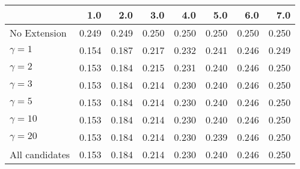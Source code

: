 \begin{tabular}{lrrrrrrr}
\toprule
{} &   1.0 &   2.0 &   3.0 &   4.0 &   5.0 &   6.0 &   7.0 \\
\midrule
No Extension   & 0.249 & 0.249 & 0.250 & 0.250 & 0.250 & 0.250 & 0.250 \\
$\gamma = 1$   & 0.154 & 0.187 & 0.217 & 0.232 & 0.241 & 0.246 & 0.249 \\
$\gamma = 2$   & 0.153 & 0.184 & 0.215 & 0.231 & 0.240 & 0.246 & 0.250 \\
$\gamma = 3$   & 0.153 & 0.184 & 0.214 & 0.230 & 0.240 & 0.246 & 0.250 \\
$\gamma = 5$   & 0.153 & 0.184 & 0.214 & 0.230 & 0.240 & 0.246 & 0.250 \\
$\gamma = 10$  & 0.153 & 0.184 & 0.214 & 0.230 & 0.240 & 0.246 & 0.250 \\
$\gamma = 20$  & 0.153 & 0.184 & 0.214 & 0.230 & 0.239 & 0.246 & 0.250 \\
All candidates & 0.153 & 0.184 & 0.214 & 0.230 & 0.240 & 0.246 & 0.250 \\
\bottomrule
\end{tabular}
